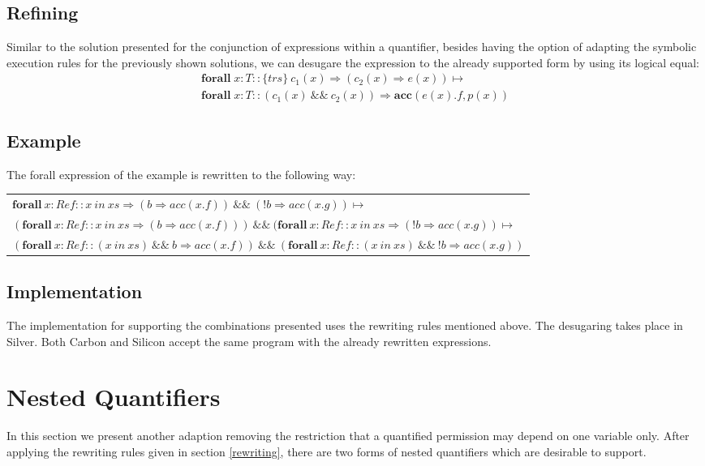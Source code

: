 \documentclass[12pt]{article}
\begin{document}
\subsection{Refining}
Similar to the solution presented for the conjunction of expressions within a quantifier, besides having the option of adapting the symbolic execution rules for the previously shown solutions, we can desugare the expression to the already supported form by using its logical equal:
\begin{equation}
\begin{aligned}
	\mathbf{forall} \; x:T ::  \{trs\}\ c_1(x) \Rightarrow (c_2(x) \Rightarrow e(x))  \mapsto \\
	\mathbf{forall} \; x:T ::( c_1(x) \:\&\&\: c_2(x)) \Rightarrow \mathbf{acc}(e(x).f, p(x))
\end{aligned}
\end{equation}

\subsection{Example}
The forall expression of the example is rewritten to the following way: \\

\begin{tabularx}{1\textwidth}{ X }
\(\mathbf{forall\ } x:Ref :: x\ in\ xs \Rightarrow (b \Rightarrow  acc(x.f)) \:\&\&\ (!b \Rightarrow acc(x.g)) \mapsto \) \\
\((\mathbf{forall\ } x:Ref :: x\ in\ xs \Rightarrow (b \Rightarrow  acc(x.f))) \:\&\&\ (\mathbf{forall\ } x:Ref :: x\ in\ xs \Rightarrow (!b \Rightarrow acc(x.g)) \mapsto \) \\
\((\mathbf{forall\ } x:Ref :: (x\ in\ xs)  \:\&\&\ b \Rightarrow acc(x.f)) \:\&\&\ (\mathbf{forall\ } x:Ref :: (x\ in\ xs)  \:\&\&\ !b \Rightarrow  acc(x.g)) \) \\
\end{tabularx}


\subsection{Implementation}
The implementation for supporting the combinations presented uses the rewriting rules mentioned above. The desugaring takes place in Silver. Both Carbon and Silicon accept the same program with the already rewritten expressions.

\section{Nested Quantifiers}
In this section we present another adaption removing the restriction that a quantified permission may depend on one variable only. After applying the rewriting rules given in section \ref{rewriting}, there are two forms of nested quantifiers which are desirable to support.
\end{document}
